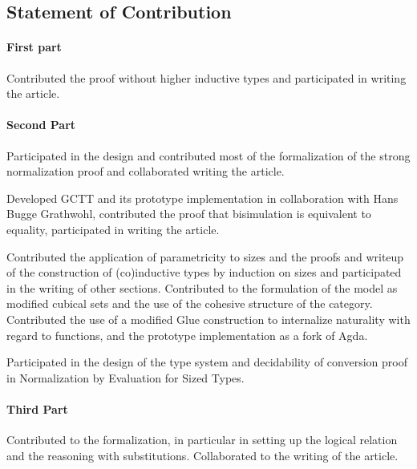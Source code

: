\documentclass{article}
\begin{document}
 
\subsection{Statement of Contribution}
\paragraph{First part}
Contributed the proof without higher inductive types and participated
in writing the article.

\paragraph{Second Part}
Participated in the design and contributed most of the formalization
of the strong normalization proof and collaborated writing the
article.

Developed GCTT and its prototype implementation in collaboration with
Hans Bugge Grathwohl, contributed the proof that bisimulation is
equivalent to equality, participated in writing the article.

Contributed the application of parametricity to sizes and the proofs
and writeup of the construction of (co)inductive types by induction on
sizes and participated in the writing of other sections. Contributed
to the formulation of the model as modified cubical sets and the use
of the cohesive structure of the category. Contributed the use of a
modified Glue construction to internalize naturality with regard to
functions, and the prototype implementation as a fork of Agda.

Participated in the design of the type system and decidability of
conversion proof in Normalization by Evaluation for Sized Types.
\paragraph{Third Part}
Contributed to the formalization, in particular in setting up the
logical relation and the reasoning with substitutions. Collaborated
to the writing of the article.
\end{document}

